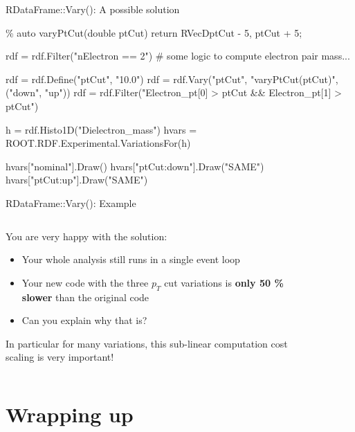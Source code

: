 \documentclass[aspectratio=169]{beamer}
\newcommand{\myfigure}[2]{
    \begin{figure}
        \makebox[\textwidth]{%
            \texttt{[image: \#2]}
        }
    \end{figure}
}
\begin{document}
\begin{frame}[fragile]{RDataFrame::Vary(): A possible solution}
\begin{cppcell}
\%%
auto varyPtCut(double ptCut) {
    return RVecD{ptCut - 5, ptCut + 5};
}
\end{cppcell}
\begin{pycell}
rdf = rdf.Filter("nElectron == 2")
# some logic to compute electron pair mass...

rdf = rdf.Define("ptCut", "10.0")
rdf = rdf.Vary("ptCut", "varyPtCut(ptCut)", ("down", "up"))
rdf = rdf.Filter("Electron_pt[0] > ptCut && Electron_pt[1] > ptCut")

h = rdf.Histo1D("Dielectron_mass")
hvars = ROOT.RDF.Experimental.VariationsFor(h)

hvars["nominal"].Draw()
hvars["ptCut:down"].Draw("SAME")
hvars["ptCut:up"].Draw("SAME")
\end{pycell}
\end{frame}

\begin{frame}[fragile]{RDataFrame::Vary(): Example}
    \begin{columns}
        \begin{column}{0.5\textwidth}
        You are very happy with the solution:
        \vspace{3mm}
        \begin{itemize}
            \item Your whole analysis still runs in a single event loop
            \item Your new code with the three $p_T$ cut variations is \textbf{only 50 \% slower} than the original code
            \item Can you explain why that is?
        \end{itemize}
        \vspace{3mm}
        In particular for many variations, this sub-linear computation cost scaling is very important!
        \end{column}
        \begin{column}{0.5\textwidth}
            \myfigure{1.1}{vary.pdf}
        \end{column}
    \end{columns}
\end{frame}

\section{Wrapping up}
\end{document}
